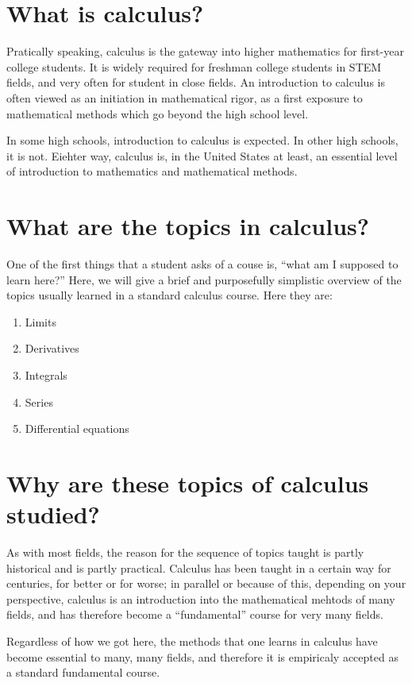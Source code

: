 \section{What is calculus?}
Pratically speaking, calculus is the gateway into higher mathematics for first-year college students. It is widely required for freshman college students in STEM fields, and very often for student in close fields. An introduction to calculus is often viewed as an initiation in mathematical rigor, as a first exposure to mathematical methods which go beyond the high school level.

In some high schools, introduction to calculus is expected. In other high schools, it is not. Eiehter way, calculus is, in the United States at least, an essential level of introduction to mathematics and mathematical methods.


\section{What are the topics in calculus?}
One of the first things that a student asks of a couse is, ``what am I supposed to learn here?'' Here, we will give a brief and purposefully simplistic overview of the topics usually learned in a standard calculus course. Here they are:
\begin{enumerate}
\item Limits
\item Derivatives
\item Integrals
\item Series
\item Differential equations
\end{enumerate}

\section{Why are these topics of calculus studied?}
As with most fields, the reason for the sequence of topics taught is partly historical and is partly practical. Calculus has been taught in a certain way for centuries, for better or for worse; in parallel or because of this, depending on your perspective, calculus is an introduction into the mathematical mehtods of many fields, and has therefore become a ``fundamental'' course for very many fields.

Regardless of how we got here, the methods that one learns in calculus have become essential to many, many fields, and therefore it is empiricaly accepted as a standard fundamental course.

